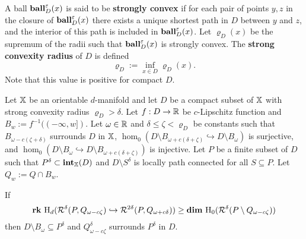 A ball $\mathbf{ball}_D^\varepsilon(x)$ is said to be \textbf{strongly convex} if for each pair of points $y,z$ in the closure of $\mathbf{ball}_D^\varepsilon(x)$ there exists a unique shortest path in $D$ between $y$ and $z$, and the interior of this path is included in $\mathbf{ball}_D^\varepsilon(x)$.
Let $\varrho_D(x)$ be the supremum of the radii such that $\mathbf{ball}_D^\varepsilon(x)$ is strongly convex.
The \textbf{strong convexity radius} of $D$ is defined
\[ \varrho_D := \inf_{x\in D} \varrho_D(x).\]
Note that this value is positive for compact $D$.

\begin{theorem}\label{thm:algo_tcc}
  Let $\mathbb{X}$ be an orientable $d$-manifold and let $D$ be a compact subset of $\mathbb{X}$ with strong convexity radius $\varrho_D > \delta$.
  Let $f : D\to\mathbb{R}$ be $c$-Lipschitz function and $B_w := f^{-1}((-\infty,w])$.
  Let $\omega\in\mathbb{R}$ and $\delta\leq\zeta < \varrho_D$ be constants such that $B_{\omega - c(\zeta +\delta)}$ surrounds $D$ in $\mathbb{X}$, $\hom_0(D\setminus B_{\omega+c(\delta+\zeta)}\hookrightarrow D\setminus B_\omega)$ is surjective, and $\hom_0(D\setminus B_\omega\hookrightarrow D\setminus B_{\omega+c(\delta+\zeta)})$ is injective.
  Let $P$ be a finite subset of $D$ such that $P^\delta\subset \mathbf{int}_{\mathbb{X}}(D)$ and $D\setminus S^\delta$ is locally path connected for all $S\subseteq P$.
  Let $Q_w := Q\cap B_w$.

  If
  \[\mathbf{rk}~\mathrm{H}_d(\mathcal{R}^\delta(P, Q_{\omega -c\zeta})\hookrightarrow \mathcal{R}^{2\delta}(P, Q_{\omega+c\delta})) \geq \mathbf{dim}~\mathrm{H}_0(\mathcal{R}^\delta(P\setminus Q_{\omega-c\zeta}))\]
  then $D\setminus B_\omega\subseteq P^\delta$ and $Q_{\omega-c\zeta}^\delta$ surrounds $P^\delta$ in $D$.
\end{theorem}
